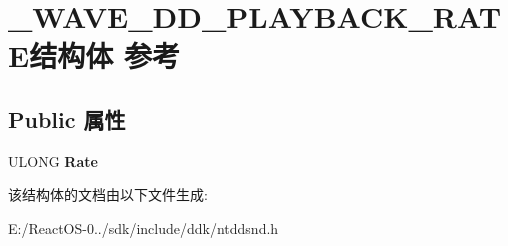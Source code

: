 \hypertarget{struct___w_a_v_e___d_d___p_l_a_y_b_a_c_k___r_a_t_e}{}\section{\+\_\+\+W\+A\+V\+E\+\_\+\+D\+D\+\_\+\+P\+L\+A\+Y\+B\+A\+C\+K\+\_\+\+R\+A\+T\+E结构体 参考}
\label{struct___w_a_v_e___d_d___p_l_a_y_b_a_c_k___r_a_t_e}
\subsection*{Public 属性}
\begin{DoxyCompactItemize}
\item 
\mbox{\label{struct___w_a_v_e___d_d___p_l_a_y_b_a_c_k___r_a_t_e_a989a98886de44fd1b14288854f851a74}} 
U\+L\+O\+NG {\bfseries Rate}
\end{DoxyCompactItemize}


该结构体的文档由以下文件生成\+:\begin{DoxyCompactItemize}
\item 
E\+:/\+React\+O\+S-\/0../sdk/include/ddk/ntddsnd.\+h\end{DoxyCompactItemize}
